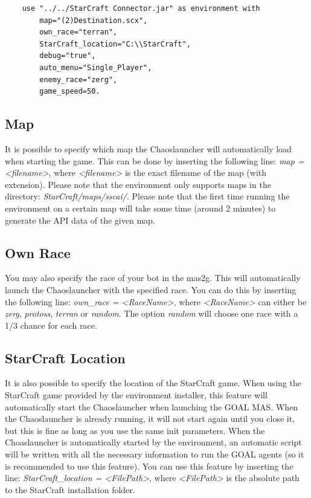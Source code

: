 \begin{verbatim}
    use "../../StarCraft Connector.jar" as environment with
        map="(2)Destination.scx",
        own_race="terran",
        StarCraft_location="C:\\StarCraft",
        debug="true",
        auto_menu="Single_Player",
        enemy_race="zerg",
        game_speed=50.
\end{verbatim}

\subsection{Map}
\label{map}
It is possible to specify which map the Chaoslauncher will automatically load when starting the game. This can be done by inserting the following line: \textit{map = <filename>}, where \textit{<filename>} is the exact filename of the map (with extension). Please note that the environment only supports maps in the directory: \textit{StarCraft/maps/sscai/}. Please note that the first time running the environment on a certain map will take some time (around 2 minutes) to generate the API data of the given map.

\subsection{Own Race}
\label{own race}
You may also specify the race of your bot in the mas2g. This will automatically launch the Chaoslauncher with the specified race. You can do this by inserting the following line: \textit{own\_race = <RaceName>}, where \textit{<RaceName>} can either be \textit{zerg}, \textit{protoss}, \textit{terran} or \textit{random}. The option \textit{random} will choose one race with a 1/3 chance for each race.

\subsection{StarCraft Location}
\label{StarCraft location}
It is also possible to specify the location of the StarCraft game. When using the StarCraft game provided by the environment installer, this feature will automatically start the Chaoslauncher when launching the GOAL MAS. When the Chaoslauncher is already running, it will not start again until you close it, but this is fine as long as you use the same init parameters. When the Choaslauncher is automatically started by the environment, an automatic script will be written with all the necessary information to run the GOAL agents (so it is recommended to use this feature). You can use this feature by inserting the line: \textit{StarCraft\_location = <FilePath>}, where \textit{<FilePath>} is the absolute path to the StarCraft installation folder.


